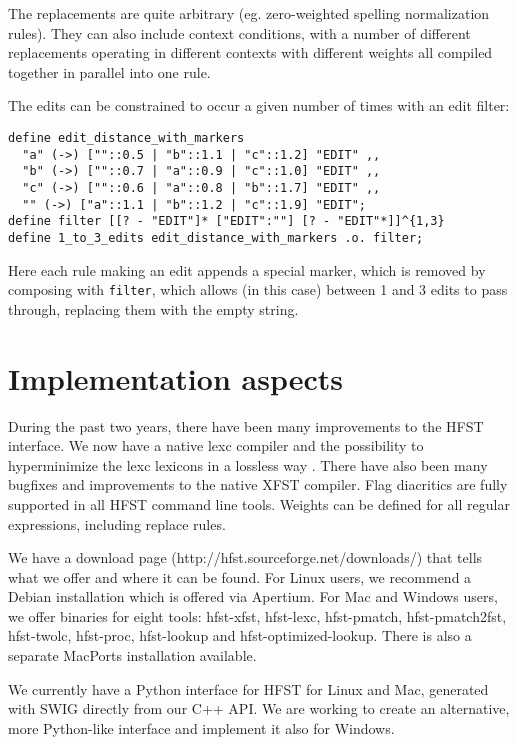 \documentclass{llncs}
\begin{document}
The replacements are quite arbitrary (eg. zero-weighted spelling normalization
rules). They can also include context conditions,
with a number of different replacements operating in different contexts with
different weights all compiled together in parallel into one rule.

The edits can be constrained to occur a given number of times with an edit
filter:

\begin{framed}
\begin{verbatim}
define edit_distance_with_markers
  "a" (->) [""::0.5 | "b"::1.1 | "c"::1.2] "EDIT" ,,
  "b" (->) [""::0.7 | "a"::0.9 | "c"::1.0] "EDIT" ,,
  "c" (->) [""::0.6 | "a"::0.8 | "b"::1.7] "EDIT" ,,
  "" (->) ["a"::1.1 | "b"::1.2 | "c"::1.9] "EDIT";
define filter [[? - "EDIT"]* ["EDIT":""] [? - "EDIT"*]]^{1,3}
define 1_to_3_edits edit_distance_with_markers .o. filter;
\end{verbatim}
\end{framed}

Here each rule making an edit appends a special marker, which is removed
by composing with \verb+filter+, which allows (in this case) between 1 and 3
edits to pass through, replacing them with the empty string.

\section{Implementation aspects}\label{sec:background}
During the past two years, there have been many improvements to the HFST 
interface. We now have a native lexc compiler and the possibility to 
hyperminimize the lexc lexicons in a lossless way \cite{drobac/2014}. There have also been many bugfixes and 
improvements to the native XFST compiler. Flag diacritics are fully supported 
in all HFST command line tools. Weights can be defined for all regular expressions,
including replace rules.

We have a download page (http://hfst.sourceforge.net/downloads/) that tells what 
we offer and where it can be found. For Linux users, we recommend a Debian installation
which is offered via Apertium. For Mac and Windows users,
we offer binaries for eight tools: hfst-xfst, hfst-lexc, hfst-pmatch,
hfst-pmatch2fst, hfst-twolc, hfst-proc, hfst-lookup and hfst-optimized-lookup.
There is also a separate MacPorts installation available.

We currently have a Python interface for HFST for Linux and Mac, generated with SWIG directly
from our C++ API. We are working to create an alternative, more Python-like interface
and implement it also for Windows.
\end{document}
